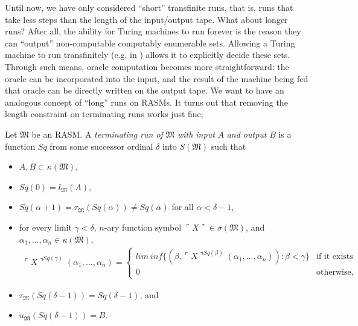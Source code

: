 \documentclass[12pt]{article}
\numberwithin{equation}{section}
\begin{document}
Until now, we have only considered ``short'' transfinite runs, that is, runs that take less steps than the length of the input/output tape. What about longer runs? After all, the ability for Turing machines to run forever is the reason they can ``output'' non-computable computably enumerable sets. Allowing a Turing machine to run transfinitely (e.g. in \cite{ittm}) allows it to explicitly decide these sets. Through such means, oracle computation becomes more straightforward: the oracle can be incorporated into the input, and the result of the machine being fed that oracle can be directly written on the output tape. We want to have an analogous concept of ``long'' runs on RASMs. It turns out that removing the length constraint on terminating runs works just fine; 

\begin{defi}\label{def242}
Let $\mathfrak{M}$ be an RASM. A \emph{terminating run of} $\mathfrak{M}$ \emph{with input} $A$ \emph{and output} $B$ is a function $Sq$ from some successor ordinal $\delta$ into $S(\mathfrak{M})$ such that 
\begin{itemize}
    \item $A, B \subset \kappa(\mathfrak{M})$,
    \item $Sq(0) = l_{\mathfrak{M}}(A)$,
    \item $Sq(\alpha + 1) = \tau_{\mathfrak{M}}(Sq(\alpha)) \neq Sq(\alpha)$ for all $\alpha < \delta - 1$,
    \item for every limit $\gamma < \delta$, $n$-ary function symbol $\ulcorner X \urcorner \in \sigma(\mathfrak{M})$, and $\alpha_1, \dots, \alpha_n \in \kappa(\mathfrak{M})$,
    \begin{gather*}
        \ulcorner X \urcorner^{Sq(\gamma)} (\alpha_1, ..., \alpha_n) \! = \! 
        \begin{cases}
            lim \ inf \{(\beta, \ulcorner X \urcorner^{Sq(\beta)}(\alpha_1, ..., \alpha_n)) \! : \! \beta < \gamma\} & \!\!\!\! \text{if it exists} \\
            0 & \!\!\!\! \text{otherwise,}
        \end{cases} 
    \end{gather*}
    \item $\tau_{\mathfrak{M}}(Sq(\delta - 1)) = Sq(\delta - 1)$, and
    \item $u_{\mathfrak{M}}(Sq(\delta - 1)) = B$.
\end{itemize}
\end{defi}
\end{document}
